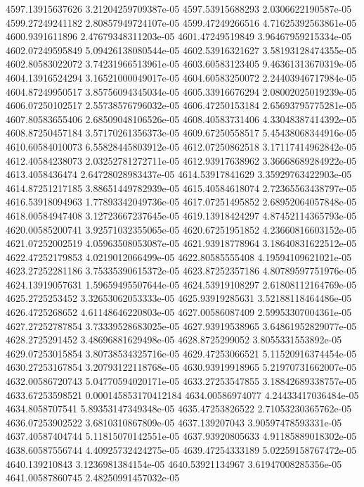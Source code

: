{4597.13915637626 3.21204259709387e-05
4597.53915688293 2.0306622190587e-05
4599.27249241182 2.80857949724107e-05
4599.47249266516 4.71625392563861e-05
4600.9391611896 2.47679348311203e-05
4601.47249519849 3.96467959215334e-05
4602.07249595849 5.09426138080544e-05
4602.53916321627 3.58193128474355e-05
4602.80583022072 3.74231966513961e-05
4603.60583123405 9.46361313670319e-05
4604.13916524294 3.16521000049017e-05
4604.60583250072 2.24403946717984e-05
4604.87249950517 3.85756094345034e-05
4605.33916676294 2.08002025019239e-05
4606.07250102517 2.55738576796032e-05
4606.47250153184 2.65693795775281e-05
4607.80583655406 2.68509048106526e-05
4608.40583731406 4.33048387414392e-05
4608.87250457184 3.57170261356373e-05
4609.67250558517 5.45438068344916e-05
4610.60584010073 6.55828445803912e-05
4612.07250862518 3.17117414962842e-05
4612.40584238073 2.03252781272711e-05
4612.93917638962 3.36668689284922e-05
4613.4058436474 2.64728028983437e-05
4614.53917841629 3.35929763422903e-05
4614.87251217185 3.88651449782939e-05
4615.40584618074 2.72365563438797e-05
4616.53918094963 1.77893342049736e-05
4617.07251495852 2.68952064057848e-05
4618.00584947408 3.12723667237645e-05
4619.13918424297 4.87452114365793e-05
4620.00585200741 3.92571032355065e-05
4620.67251951852 4.23660816603152e-05
4621.07252002519 4.05963508053087e-05
4621.93918778964 3.18640831622512e-05
4622.47252179853 4.0219012066499e-05
4622.80585555408 4.19594109621021e-05
4623.27252281186 3.75335390615372e-05
4623.87252357186 4.80789597751976e-05
4624.13919057631 1.59659495507644e-05
4624.53919108297 2.61808112164769e-05
4625.2725253452 3.32653062053333e-05
4625.93919285631 3.52188118464486e-05
4626.4725268652 4.61148646220803e-05
4627.00586087409 2.59953307004361e-05
4627.27252787854 3.73339528683025e-05
4627.93919538965 3.64861952829077e-05
4628.2725291452 3.48696881629498e-05
4628.8725299052 3.8055331553892e-05
4629.07253015854 3.80738534325716e-05
4629.47253066521 5.11520916374454e-05
4630.27253167854 3.20793122118768e-05
4630.93919918965 5.21970731662007e-05
4632.00586720743 5.04770594020171e-05
4633.27253547855 3.18842689338757e-05
4633.67253598521 0.000145853170412184
4634.00586974077 4.24433417036484e-05
4634.8058707541 5.89353147349348e-05
4635.47253826522 2.71053230365762e-05
4636.07253902522 3.6810310867809e-05
4637.139207043 3.90597478593331e-05
4637.40587404744 5.11815070142551e-05
4637.93920805633 4.91185889018302e-05
4638.60587556744 4.40925732424275e-05
4639.47254333189 5.02259158767472e-05
4640.139210843 3.1236981384154e-05
4640.53921134967 3.61947008285356e-05
4641.00587860745 2.48250991457032e-05
}
